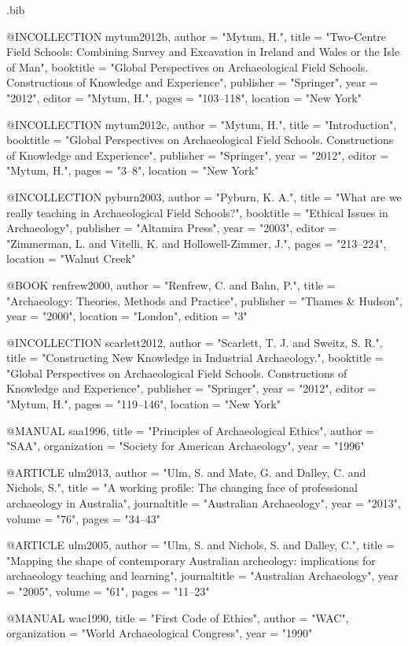 \begin{filecontents}{\IJSRAidentifier.bib}
	
	@INCOLLECTION {mytum2012b,
		author    = "Mytum, H.",
		title     = "Two-Centre Field Schools: Combining Survey and Excavation in Ireland and Wales or the Isle of Man",
		booktitle = "Global Perspectives on Archaeological Field Schools. Constructions of Knowledge and Experience",
		publisher = "Springer",
		year      = "2012",
		editor    = "Mytum, H.",
		pages     = "103--118",
		location   = "New York"
	}
	
	
	@INCOLLECTION {mytum2012c,
		author    = "Mytum, H.",
		title     = "Introduction",
		booktitle = "Global Perspectives on Archaeological Field Schools. Constructions of Knowledge and Experience",
		publisher = "Springer",
		year      = "2012",
		editor    = "Mytum, H.",
		pages     = "3--8",
		location   = "New York"
	}
	
	
	@INCOLLECTION {pyburn2003,
		author    = "Pyburn, K. A.",
		title     = "What are we really teaching in Archaeological Field Schools?",
		booktitle = "Ethical Issues in Archaeology",
		publisher = "Altamira Press",
		year      = "2003",
		editor    = "Zimmerman, L. and Vitelli, K. and Hollowell-Zimmer, J.",
		pages     = "213--224",
		location   = "Walnut Creek"
	}
	
	
	@BOOK {renfrew2000,
		author    = "Renfrew, C. and Bahn, P.",
		title     = "Archaeology: Theories, Methods and Practice",
		publisher = "Thames \& Hudson",
		year      = "2000",
		location   = "London",
		edition   = "3"
	}
	
	@INCOLLECTION {scarlett2012,
		author    = "Scarlett, T. J. and Sweitz, S. R.",
		title     = "Constructing New Knowledge in Industrial Archaeology.",
		booktitle = "Global Perspectives on Archaeological Field Schools. Constructions of Knowledge and Experience",
		publisher = "Springer",
		year      = "2012",
		editor    = "Mytum, H.",
		pages     = "119--146",
		location   = "New York"
	}
	
	
	@MANUAL {saa1996,
		title        = "Principles of Archaeological Ethics",
		author       = "SAA",
		organization = "Society for American Archaeology",
		year         = "1996"
	}
	
	
	@ARTICLE {ulm2013,
		author  = "Ulm, S. and Mate, G. and Dalley, C. and Nichols, S.",
		title   = "A working profile: The changing face of professional archaeology in Australia",
		journaltitle = "Australian Archaeology",
		year    = "2013",
		volume  = "76",
		pages   = "34--43"
	}
	
	
	@ARTICLE {ulm2005,
		author  = "Ulm, S. and Nichols, S. and Dalley, C.",
		title   = "Mapping the shape of contemporary Australian archeology: implications for archaeology teaching and learning",
		journaltitle = "Australian Archaeology",
		year    = "2005",
		volume  = "61",
		pages   = "11--23"
	}
	
	
	@MANUAL {wac1990,
		title        = "First Code of Ethics",
		author       = "WAC",
		organization = "World Archaeological Congress",
		year         = "1990"
	}
\end{filecontents}
